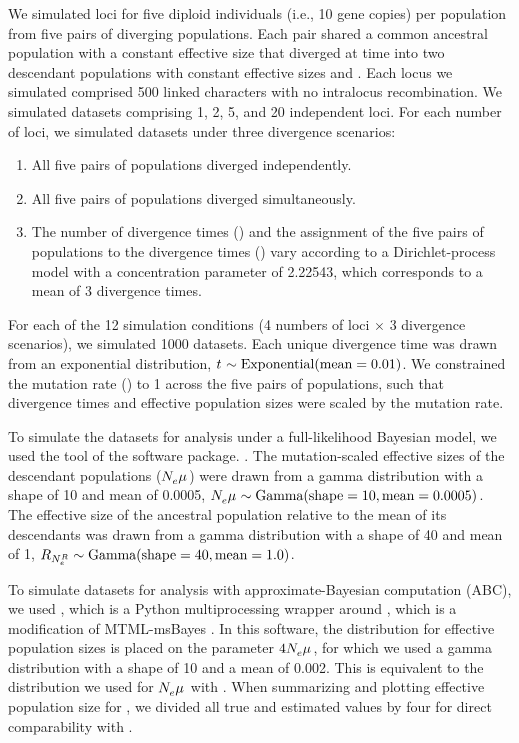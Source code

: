 \documentclass[letterpaper,12pt]{article}
\begin{document}
We simulated loci for five diploid individuals (i.e., 10 gene
copies) per population from five pairs of diverging populations.
Each pair shared a common ancestral population with a constant effective size
\epopsize[\rootpopindex]
that diverged at time
\comparisonetime{}
into two descendant populations with constant effective sizes
\epopsize[\descendantpopindex{1}]
and 
\epopsize[\descendantpopindex{2}].
Each locus we simulated comprised 500 linked characters with no intralocus
recombination.
We simulated datasets comprising 1, 2, 5, and 20 independent loci.
For each number of loci, we simulated datasets under three divergence
scenarios:
\begin{enumerate}
    \item All five pairs of populations diverged independently.
    \item All five pairs of populations diverged simultaneously.
    \item The number of divergence times (\nevents) and the assignment of the
        five pairs of populations to the divergence times (\etimesets) vary
        according to a Dirichlet-process model with a concentration parameter
        of 2.22543, which corresponds to a mean of 3 divergence times.
\end{enumerate}
For each of the 12 simulation conditions (4 numbers of loci $\times$ 3
divergence scenarios),
we simulated 1000 datasets.
Each unique divergence time was drawn from an exponential distribution,
$t_{} \sim \textrm{Exponential}(\textrm{mean} = 0.01)$.
We constrained the mutation rate (\murate{}) to 1 across the five pairs of
populations, such that divergence times and effective population sizes were
scaled by the mutation rate.

To simulate the datasets for analysis under a full-likelihood Bayesian model,
we used the \simcoevolity tool of the \ecoevolity software package.
\citep[Version 0.3.2, Commit c128046;][]{Oaks2018ecoevolity,Oaks2018paic}.
The mutation-scaled effective sizes of the descendant populations
($N_{e}^{}\mu_{}$) were drawn from a gamma distribution with a shape of 10
and mean of 0.0005,
$N_{e}^{}{}\mu_{}{} \sim \textrm{Gamma}(\textrm{shape} = 10, \textrm{mean} = 0.0005)$.
The effective size of the ancestral population relative to the mean of
its descendants was drawn from a gamma distribution with a shape of 40 and mean of 1,
$R_{N_{e}^{R{}}} \sim \textrm{Gamma}(\textrm{shape} = 40, \textrm{mean} = 1.0)$.

To simulate datasets for analysis with
approximate-Bayesian computation (ABC),
we used \pymsbayes
\citep[Version 0.3.7, Commit 54f720df;][]{Oaks2014dpp},
which is a Python multiprocessing wrapper around \dppmsbayes
\citep{Oaks2014dpp}, which is a modification of
MTML-msBayes \citep{Huang2011}.
In this software, the distribution for effective population sizes is placed
on the parameter $4N_{e}^{}{}\mu_{}{}$, for which we used
a gamma distribution with a shape of 10 and a mean of 0.002.
This is equivalent to the distribution we used for $N_{e}^{}{}\mu_{}{}$ with
\ecoevolity.
When summarizing and plotting effective population size for \pymsbayes, we
divided all true and estimated values by four for direct comparability with
\ecoevolity.
\end{document}
